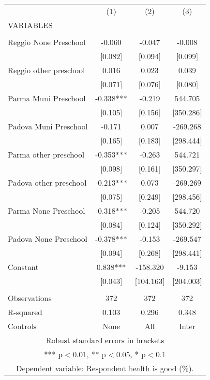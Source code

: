 \begin{tabular}{lccc} \hline
 & (1) & (2) & (3) \\
VARIABLES &  &  &  \\ \hline
 &  &  &  \\
Reggio None Preschool & -0.060 & -0.047 & -0.008 \\
 & [0.082] & [0.094] & [0.099] \\
Reggio other preschool & 0.016 & 0.023 & 0.039 \\
 & [0.071] & [0.076] & [0.080] \\
Parma Muni Preschool & -0.338*** & -0.219 & 544.705 \\
 & [0.105] & [0.156] & [350.286] \\
Padova Muni Preschool & -0.171 & 0.007 & -269.268 \\
 & [0.165] & [0.183] & [298.444] \\
Parma other preschool & -0.353*** & -0.263 & 544.721 \\
 & [0.098] & [0.161] & [350.297] \\
Padova other preschool & -0.213*** & 0.073 & -269.269 \\
 & [0.075] & [0.249] & [298.456] \\
Parma None Preschool & -0.318*** & -0.205 & 544.720 \\
 & [0.084] & [0.124] & [350.292] \\
Padova None Preschool & -0.378*** & -0.153 & -269.547 \\
 & [0.094] & [0.268] & [298.441] \\
Constant & 0.838*** & -158.320 & -9.153 \\
 & [0.043] & [104.163] & [204.003] \\
 &  &  &  \\
Observations & 372 & 372 & 372 \\
R-squared & 0.103 & 0.296 & 0.348 \\
 Controls & None & All & Inter \\ \hline
\multicolumn{4}{c}{ Robust standard errors in brackets} \\
\multicolumn{4}{c}{ *** p$<$0.01, ** p$<$0.05, * p$<$0.1} \\
\multicolumn{4}{c}{ Dependent variable: Respondent health is good (\%).} \\
\end{tabular}
